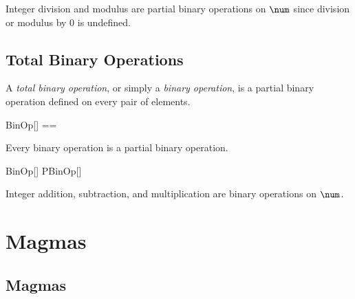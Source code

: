 \documentclass{amsart}
\begin{document}
\begin{example}

Integer division and modulus are partial binary operations on $\num$ since division or modulus by $0$ is
undefined.


\end{example}

\subsection{Total Binary Operations}

A \textit{total binary operation}, or simply a \textit{binary operation}, is a partial binary operation defined on
every pair of elements.

\begin{zed}
	BinOp[\genT] == \genT \cross \genT \fun \genT
\end{zed}

\begin{remark} Every binary operation is a partial binary operation.

\begin{zed}
	BinOp[\setT] \subseteq PBinOp[\setT]
\end{zed}

\end{remark}

\begin{example}

Integer addition, subtraction, and multiplication are binary operations on $\num$.


\end{example}

\section{Magmas}

\subsection{Magmas}
\end{document}
